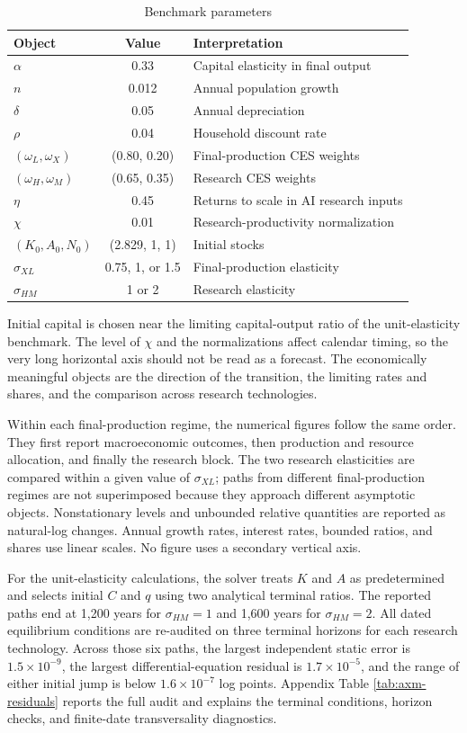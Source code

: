 \begin{table}[H]
\centering
\caption{Benchmark parameters}
\label{tab:axm-parameters}
\begin{tabular}{lcl}
\toprule
Object & Value & Interpretation\\
\midrule
\(\alpha\) & 0.33 & Capital elasticity in final output\\
\(n\) & 0.012 & Annual population growth\\
\(\delta\) & 0.05 & Annual depreciation\\
\(\rho\) & 0.04 & Household discount rate\\
\((\omega_L,\omega_X)\) & (0.80, 0.20) & Final-production CES weights\\
\((\omega_H,\omega_M)\) & (0.65, 0.35) & Research CES weights\\
\(\eta\) & 0.45 & Returns to scale in AI research inputs\\
\(\chi\) & 0.01 & Research-productivity normalization\\
\((K_0,A_0,N_0)\) & (2.829, 1, 1) & Initial stocks\\
\(\sigma_{XL}\) & 0.75, 1, or 1.5 & Final-production elasticity\\
\(\sigma_{HM}\) & 1 or 2 & Research elasticity\\
\bottomrule
\end{tabular}
\end{table}

Initial capital is chosen near the limiting capital-output ratio of the
unit-elasticity benchmark. The level of
\(\chi\) and the normalizations affect calendar timing, so the very long horizontal
axis should not be read as a forecast. The economically meaningful objects are
the direction of the transition, the limiting rates and shares, and the
comparison across research technologies.

Within each final-production regime, the numerical figures follow the same
order. They first report macroeconomic outcomes, then production and resource
allocation, and finally the research block. The two research elasticities are
compared within a given value of \(\sigma_{XL}\); paths from different
final-production regimes are not superimposed because they approach different
asymptotic objects. Nonstationary levels and unbounded relative quantities are
reported as natural-log changes. Annual growth rates, interest rates, bounded
ratios, and shares use linear scales. No figure uses a secondary vertical axis.

For the unit-elasticity calculations, the solver treats \(K\) and \(A\) as
predetermined and selects initial \(C\) and \(q\) using two analytical terminal
ratios. The reported paths end at 1,200 years for \(\sigma_{HM}=1\) and 1,600
years for \(\sigma_{HM}=2\). All dated equilibrium conditions are re-audited on
three terminal horizons for each research technology. Across those six paths,
the largest independent static error is \(1.5\times10^{-9}\), the largest
differential-equation residual is \(1.7\times10^{-5}\), and the range of either
initial jump is below \(1.6\times10^{-7}\) log points. Appendix Table
\ref{tab:axm-residuals} reports the full audit and explains the terminal
conditions, horizon checks, and finite-date transversality diagnostics.

